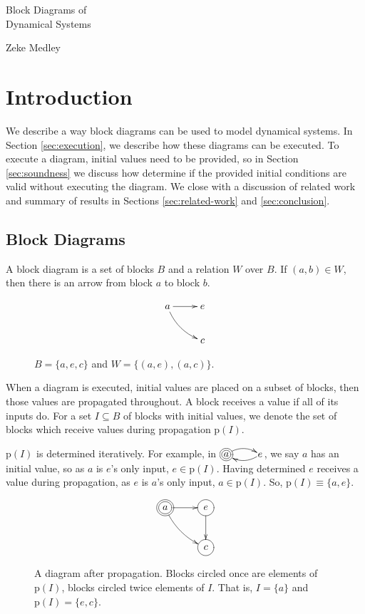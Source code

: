 \documentclass[twocolumn]{article}
\begin{document}
\LARGE
\noindent Block Diagrams of \\ Dynamical Systems \par
\vspace{0.68em}
\large
\noindent Zeke Medley
\normalsize

\section{Introduction}

We describe a way block diagrams can be used to model dynamical systems. In Section \ref{sec:execution}, we describe how these diagrams can be executed. To execute a diagram, initial values need to be provided, so in Section \ref{sec:soundness} we discuss how determine if the provided initial conditions are valid without executing the diagram. We close with a discussion of related work and summary of results in Sections \ref{sec:related-work} and \ref{sec:conclusion}.

\subsection{Block Diagrams}

A block diagram is a set of blocks $B$ and a relation $W$ over $B$. If $(a, b)\in W$, then there is an arrow from block $a$ to block $b$. 


\begin{figure}[h]
\[
    \xymatrix {
        a \ar[r] \ar@/_/[dr] & e \\
        & c
    }
\]
    \caption{$B=\{a, e, c\}$ and $W=\{(a,e), (a, c)\}$.}
    \label{fig:example1}
\end{figure}

When a diagram is executed, initial values are placed on a subset of blocks, then those values are propagated throughout. A block receives a value if all of its inputs do. For a set $I\subseteq B$ of blocks with initial values, we denote the set of blocks which receive values during propagation $\text{p}(I)$.

$\text{p}(I)$ is determined iteratively. For example, in $\xymatrix@1{*++++[o][F=]{a} \ar@/^/[r] & e \ar@/^/[l]}$, we say $a$ has an initial value, so as $a$ is $e$'s only input, $e\in \text{p}(I)$. Having determined $e$ receives a value during propagation, as $e$ is $a$'s only input, $a\in \text{p}(I)$. So, $\text{p}(I)\equiv \{a, e\}$.

\begin{figure}[h]
\[
    \xymatrix {
        *++[o][F=]{a} \ar[r] \ar@/_/[dr] & *++[o][F-]{e} \ar[d] \\
        & *++[o][F-]{c}
    }
\]
    \caption{A diagram after propagation. Blocks circled once are elements of $\text{p}(I)$, blocks circled twice elements of $I$. That is, $I=\{a\}$ and $\text{p}(I)=\{e, c\}$.}
    \label{fig:piisnoti}
\end{figure}
\end{document}
